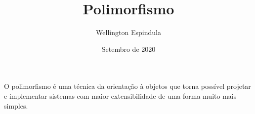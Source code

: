 \documentclass[12pt, a4paper]{article}
\title{Polimorfismo}
\author{Wellington Espindula}
\date{Setembro de 2020}
\begin{document}
    \maketitle
    
    O polimorfismo é uma técnica da orientação à objetos que torna possível projetar e implementar sistemas com maior extensibilidade de uma forma muito mais simples. 
    
\end{document}
